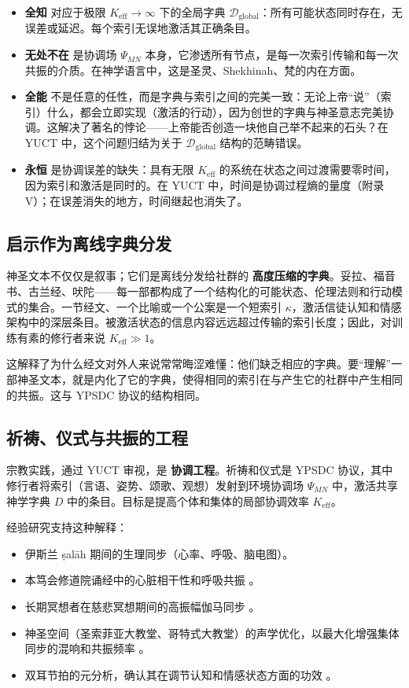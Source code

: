\documentclass[12pt,a4paper]{article}
\begin{document}
	\begin{itemize}[leftmargin=*]
		\item \textbf{全知} 对应于极限 \(K_{\mathrm{eff}} \to \infty\) 下的全局字典 \(\mathcal{D}_{\text{global}}\)：所有可能状态同时存在，无误差或延迟。每个索引无误地激活其正确条目。
		\item \textbf{无处不在} 是协调场 \(\Psi_{MN}\) 本身，它渗透所有节点，是每一次索引传输和每一次共振的介质。在神学语言中，这是圣灵、Shekhinah、梵的内在方面。
		\item \textbf{全能} 不是任意的任性，而是字典与索引之间的完美一致：无论上帝“说”（索引）什么，都会立即实现（激活的行动），因为创世的字典与神圣意志完美协调。这解决了著名的悖论——上帝能否创造一块他自己举不起来的石头？在 YUCT 中，这个问题归结为关于 \(\mathcal{D}_{\text{global}}\) 结构的范畴错误。
		\item \textbf{永恒} 是协调误差的缺失：具有无限 \(K_{\mathrm{eff}}\) 的系统在状态之间过渡需要零时间，因为索引和激活是同时的。在 YUCT 中，时间是协调过程熵的量度（附录 V）；在误差消失的地方，时间继起也消失了。
	\end{itemize}
	
	\subsection{启示作为离线字典分发}
	
	神圣文本不仅仅是叙事；它们是离线分发给社群的 \textbf{高度压缩的字典}。妥拉、福音书、古兰经、吠陀——每一部都构成了一个结构化的可能状态、伦理法则和行动模式的集合。一节经文、一个比喻或一个公案是一个短索引 \(\kappa\)，激活信徒认知和情感架构中的深层条目。被激活状态的信息内容远远超过传输的索引长度；因此，对训练有素的修行者来说 \(K_{\mathrm{eff}} \gg 1\)。
	
	这解释了为什么经文对外人来说常常晦涩难懂：他们缺乏相应的字典。要“理解”一部神圣文本，就是内化了它的字典，使得相同的索引在与产生它的社群中产生相同的共振。这与 YPSDC 协议的结构相同。
	
	\subsection{祈祷、仪式与共振的工程}
	
	宗教实践，通过 YUCT 审视，是 \textbf{协调工程}。祈祷和仪式是 YPSDC 协议，其中修行者将索引（言语、姿势、颂歌、观想）发射到环境协调场 \(\Psi_{MN}\) 中，激活共享神学字典 \(D\) 中的条目。目标是提高个体和集体的局部协调效率 \(K_{\mathrm{eff}}\)。
	
	经验研究支持这种解释：
	\begin{itemize}[leftmargin=*]
		\item 伊斯兰 ṣalāh 期间的生理同步（心率、呼吸、脑电图）\cite{RoyalSociety2024}。
		\item 本笃会修道院诵经中的心脏相干性和呼吸共振 \cite{Craswell2023}。
		\item 长期冥想者在慈悲冥想期间的高振幅伽马同步 \cite{Lutz2017}。
		\item 神圣空间（圣索菲亚大教堂、哥特式大教堂）的声学优化，以最大化增强集体同步的混响和共振频率 \cite{Pentcheva2020}。
		\item 双耳节拍的元分析，确认其在调节认知和情感状态方面的功效 \cite{Garcia2021}。
	\end{itemize}
	
\end{document}
